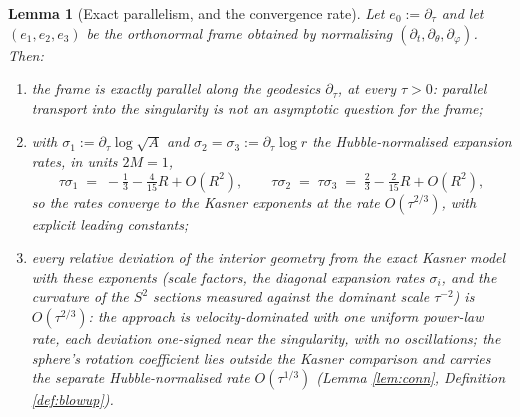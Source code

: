 \documentclass[11pt]{article}
\newtheorem{lemma}[theorem]{Lemma}
\theoremstyle{definition}
\begin{document}
\begin{lemma}[Exact parallelism, and the convergence rate]\label{lem:parallel}
Let $e_0 := \partial_\tau$ and let $(e_1, e_2, e_3)$ be the orthonormal frame obtained by normalising $(\partial_t, \partial_\theta, \partial_\varphi)$. Then:
\begin{enumerate}
\item the frame is \emph{exactly} parallel along the geodesics $\partial_\tau$, at every $\tau > 0$: parallel transport into the singularity is not an asymptotic question for the frame;
\item with $\sigma_1 := \partial_\tau \log \sqrt{A}$ and $\sigma_2 = \sigma_3 := \partial_\tau \log r$ the Hubble-normalised expansion rates, in units $2M = 1$,
\[
\tau\sigma_1 \;=\; -\tfrac13 - \tfrac{4}{15}R + O(R^2),
\qquad
\tau\sigma_2 \;=\; \tau\sigma_3 \;=\; \tfrac23 - \tfrac{2}{15}R + O(R^2),
\]
so the rates converge to the Kasner exponents at the rate $O(\tau^{2/3})$, with explicit leading constants;
\item every relative deviation of the interior geometry from the exact Kasner model with these exponents (scale factors, the diagonal expansion rates $\sigma_i$, and the curvature of the $S^2$ sections measured against the dominant scale $\tau^{-2}$) is $O(\tau^{2/3})$: the approach is velocity-dominated with one uniform power-law rate, each deviation one-signed near the singularity, with no oscillations; the sphere's rotation coefficient lies outside the Kasner comparison and carries the separate Hubble-normalised rate $O(\tau^{1/3})$ (Lemma \ref{lem:conn}, Definition \ref{def:blowup}).
\end{enumerate}
\end{lemma}
\end{document}
